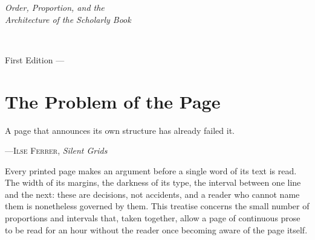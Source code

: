 \documentclass[11pt,paper=a4,footinclude=true,headinclude=true,open=any]{scrbook}
\begin{document}
\frontmatter

\begin{titlepage}
\thispagestyle{empty}
\begin{flushright}
\vspace*{3.6cm}
{\fontsize{30}{36}\selectfont\color{umberink}}\par
\vspace{0.7cm}
{\Large\itshape\color{claybrick}Order, Proportion, and the\\ Architecture of the Scholarly Book}\par
\vspace{2.4cm}
{\large{}}\par
\vspace{0.35cm}
{\small\color{slatestone}\\
}\par
{}
\par
\vspace{0.3cm}
{\small\color{umberink}First Edition --- \the\year}
\end{flushright}
\end{titlepage}

\tableofcontents

\mainmatter
\pagestyle{scrheadings}

\chapter{The Problem of the Page}
\label{chap:problem}

\epigraph{A page that announces its own structure has already failed it.}{---\textsc{Ilse Ferrer}, \emph{Silent Grids}}

Every printed page makes an argument before a single word of its text is read. The width of its margins, the darkness of its type, the interval between one line and the next: these are decisions, not accidents, and a reader who cannot name them is nonetheless governed by them. This treatise concerns the small number of proportions and intervals that, taken together, allow a page of continuous prose to be read for an hour without the reader once becoming aware of the page itself.
\end{document}
